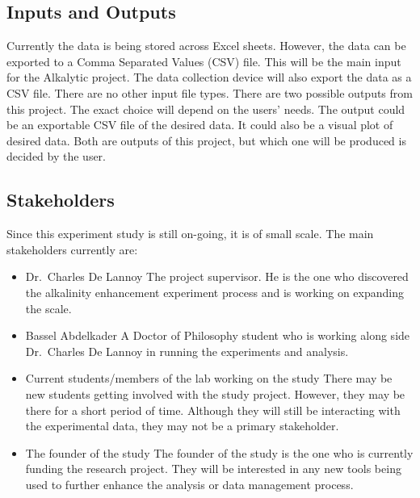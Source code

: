 \documentclass{article}
\begin{document}
\subsection{Inputs and Outputs}
Currently the data is being stored across Excel sheets. However, the data can be
exported to a Comma Separated Values (CSV) file. This will be the main input for
the Alkalytic project. The data collection device will also export the data as a
CSV file. There are no other input file types.
\newline
\newline
There are two possible outputs from this project. The exact choice will depend
on the users' needs. The output could be an exportable CSV file of the desired
data. It could also be a visual plot of desired data. Both are outputs of this
project, but which one will be produced is decided by the user.


\subsection{Stakeholders}
Since this experiment study is still on-going, it is of small scale. \newline
The main stakeholders currently are:
\begin{itemize}
    \item Dr.\ Charles De Lannoy \newline
        The project supervisor. He is the one who discovered the alkalinity
        enhancement experiment process and is working on expanding the scale. 
    \item Bassel Abdelkader \newline
        A Doctor of Philosophy student who is working along side Dr.\ Charles De
        Lannoy in running the experiments and analysis. 
    \item Current students/members of the lab working on the study \newline
        There may be new students getting involved with the study project.
        However, they may be there for a short period of time. Although they
        will still be interacting with the experimental data, they may not be a
        primary stakeholder. 
    \item The founder of the study \newline
        The founder of the study is the one who is currently funding the
        research project. They will be interested in any new tools being used to
        further enhance the analysis or data management process.
\end{itemize}
\end{document}

